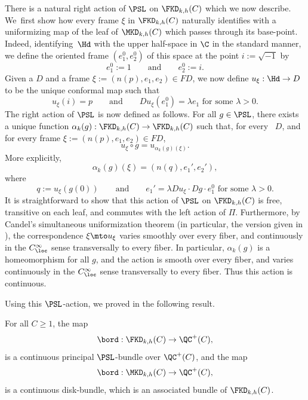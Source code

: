 There is a natural right action of $\PSL$ on $\FKD_{k,h}(C)$ which we now describe. We~first show how every frame $\xi$ in $\FKD_{k,h}(C)$ naturally identifies with a uniformizing map of the leaf of $\MKD_{k,h}(C)$ which passes through its base-point. Indeed, identifying~$\Hd$ with the upper half-space in $\C$ in the standard manner, we define the oriented frame $(e_1^0,e_2^0)$ of this space at the point $i:=\sqrt{-1}$ by
\begin{equation*}
e_1^0 := 1\qquad\text{and}\qquad e_2^0 := i.
\end{equation*}
Given a \kdisk $D$ and a frame $\xi:=(n(p),e_1,e_2)\in FD$, we now define $u_\xi:\Hd\to D$ to be the unique conformal map such that
\begin{equation*}
u_\xi(i)=p\qquad\text{and}\qquad Du_\xi(e_1^0)=\lambda e_1\,\,\text{for some }\lambda>0.
\end{equation*}
The right action of $\PSL$ is now defined as follows. For all $g\in\PSL$, there exists a unique function $\alpha_k(g):\FKD_{k,h}(C)\to\FKD_{k,h}(C)$ such that, for every \kdisk~$D$, and for every frame $\xi:=(n(p),e_1,e_2)\in FD$,
\begin{equation*}
u_\xi\circ g = u_{\alpha_k(g)(\xi)}.
\end{equation*}
More explicitly,
\begin{equation*}
\alpha_k(g)(\xi) = (n(q),e_1',e_2'),
\end{equation*}
where
\begin{equation*}
q := u_\xi(g(0))\qquad\text{and}\qquad e_1'=\lambda Du_\xi\cdot Dg\cdot e_1^0\,\,\text{for some }\lambda>0.
\end{equation*}
It is straightforward to show that this action of $\PSL$ on $\FKD_{k,h}(C)$ is free, transitive on each leaf, and commutes with the left action of $\Pi$. Furthermore, by Candel's simultaneous uniformization theorem (in particular, the version given in \cite[Th.\,2.7]{AlvarezSmith}), the correspondence $\xi\mto u_\xi$ varies smoothly over every fiber, and continuously in the $C^\infty_\loc$ sense transversally to every fiber. In particular, $\alpha_k(g)$ is a homeomorphism for all $g$, and the action is smooth over every fiber, and varies continuously in the $C^\infty_\loc$ sense transversally to every fiber. Thus this action is continuous.

Using this $\PSL$-action, we proved in \cite[Th.\,3.1.2. \& 3.2.2]{ALS} the following result.

\begin{theorem}\label{t.fibered_PP}
For all $C\geq 1$, the map
\begin{equation*}
\bord :\FKD_{k,h}(C)\to\QC^+(C),
\end{equation*}
is a continuous principal $\PSL$-bundle over $\QC^+(C)$, and the map
\begin{equation*}
\bord :\MKD_{k,h}(C)\to\QC^+(C),
\end{equation*}
is a continuous disk-bundle, which is an associated bundle of $\FKD_{k,h}(C)$.
\end{theorem}

